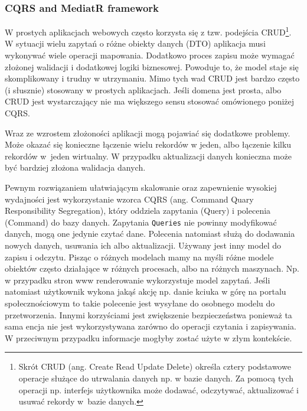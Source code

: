 
\subsubsection{CQRS and MediatR framework}\label{sec/lab4/cqrs}


W prostych aplikacjach webowych często korzysta się z tzw. podejścia CRUD\footnote{Skrót CRUD (ang. Create Read Update Delete) określa cztery podstawowe operacje służące do utrwalania danych np. w bazie danych. Za pomocą tych operacji  np. interfejs użytkownika może dodawać, odczytywać, aktualizować i usuwać rekordy w~bazie danych.}. W sytuacji wielu zapytań o różne obiekty danych (DTO) aplikacja musi wykonywać wiele operacji mapowania. Dodatkowo proces zapisu może wymagać złożonej walidacji i dodatkowej logiki biznesowej. Powoduje to, że model staje się skomplikowany i trudny w utrzymaniu. Mimo tych wad CRUD jest bardzo często (i słusznie) stosowany w prostych aplikacjach. Jeśli domena jest prosta, albo CRUD jest wystarczający nie ma większego sensu stosować omówionego poniżej CQRS.
 
Wraz ze wzrostem złożoności aplikacji mogą pojawiać się dodatkowe problemy. Może okazać się konieczne łączenie wielu rekordów w jeden, albo łączenie kilku rekordów w~jeden wirtualny. W przypadku aktualizacji danych konieczna może być bardziej złożona walidacja danych. 
 
Pewnym rozwiązaniem ułatwiającym skalowanie oraz zapewnienie wysokiej wydajności jest wykorzystanie wzorca CQRS (ang. Command Quary Responsibility Segregation), który oddziela zapytania (Query) i polecenia (Command) do bazy danych. Zapytania \texttt{Queries} nie powinny modyfikować danych, mogą one jedynie czytać dane. Polecenia natomiast służą do dodawania nowych danych, usuwania ich albo aktualizacji. Używany jest inny model do zapisu i odczytu. Pisząc o różnych modelach mamy na myśli różne modele obiektów często działające w różnych procesach, albo na różnych maszynach. Np. w przypadku stron www renderowanie wykorzystuje model zapytań. Jeśli natomiast użytkownik wykona jakąś akcję np. danie kciuka w górę na portalu społecznościowym to takie polecenie jest wysyłane do osobnego modelu do przetworzenia. Innymi korzyściami jest zwiększenie bezpieczeństwa ponieważ ta sama encja nie jest wykorzystywana zarówno do operacji czytania i zapisywania. W przeciwnym przypadku informacje mogłyby zostać użyte w złym kontekście. 

